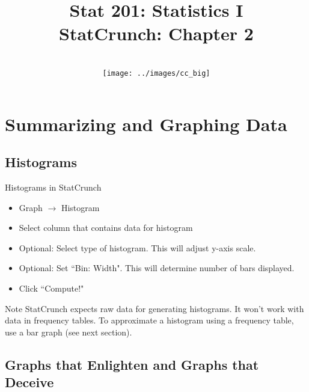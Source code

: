 \documentclass[aspectratio=169]{beamer}
\title[Chapter 2]{Stat 201: Statistics I\\ StatCrunch: Chapter 2}
\author[M. Shyne]{}
\institute[Metro State]{\texttt{[image: ../images/metro\_logo]}}
\date[5/9/2018]{
\\ \bigskip \bigskip \texttt{[image: ../images/cc\_big]}}
\begin{document}
\frame{\titlepage}

\setcounter{section}{1}
\section{Summarizing and Graphing Data}


\setcounter{subsection}{1}
\subsection{Histograms}


\begin{frame}{Histograms in StatCrunch}
\begin{block}{}
\begin{itemize}
\item Graph $\to$ Histogram
\item Select column that contains data for histogram
\item Optional: Select type of histogram. This will adjust y-axis scale.
\item Optional: Set ``Bin: Width". This will determine number of bars displayed.
\item Click ``Compute!"
\end{itemize}
\end{block}

\begin{alertblock}{Note}
StatCrunch expects raw data for generating histograms. It won't work with data in frequency tables. To approximate a histogram using a frequency table, use a bar graph (see next section).
\end{alertblock}
\end{frame}


\subsection{Graphs that Enlighten and Graphs that Deceive}
\end{document}
